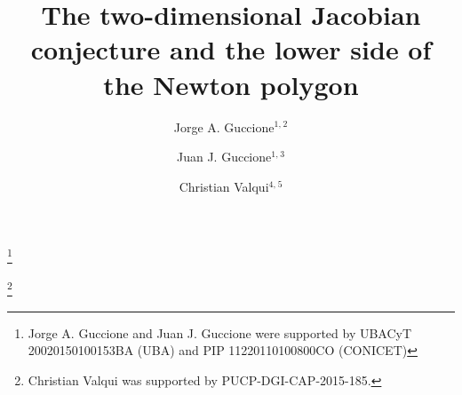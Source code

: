 \documentclass[reqno,a4paper]{amsart}
\theoremstyle{definition}
\theoremstyle{remark}
\begin{document}
\title[The two-dimensional Jacobian conjecture]{The two-dimensional Jacobian conjecture and the lower side of the Newton polygon}

\author[Jorge A. Guccione]{Jorge A. Guccione$^{1,}$$^2$}
\address{$^1$ Universidad de Buenos Aires. Facultad de Ciencias Exactas y Naturales. Departamento de Matem\'atica. Buenos Aires. Argentina}
\address{$^2$ CONICET-Universidad de Buenos Aires. Instituto de Investigaciones Matem\'aticas ``Luis A. santal\'o'' (IMAS). Buenos Aires. Argentina}



\author[Juan J. Guccione]{Juan J. Guccione$^{1,}$$^3$}
\address{$^3$ CONICET. Instituto Argentino de Matem\'atica (IAM). Buenos Aires. Argentina}



\thanks{Jorge A. Guccione and Juan J. Guccione were supported by UBACyT 20020150100153BA (UBA) and PIP 11220110100800CO (CONICET)}

\author{Christian Valqui$^{4,}$$^5$}
\address{$^4$Pontificia Universidad Cat\'olica del Per\'u, Secci\'on Matem\'aticas, PUCP,
Av. Universitaria 1801, San Miguel, Lima 32, Per\'u.}

\address{$^5$Instituto de Matem\'atica y Ciencias Afines (IMCA) Calle Los Bi\'ologos 245. Urb San C\'esar.
La Molina, Lima 12, Per\'u.}
\thanks{Christian Valqui was supported by PUCP-DGI-CAP-2015-185.}
\end{document}
